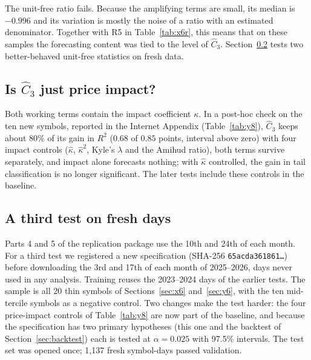 \documentclass[12pt]{article}
\theoremstyle{definition}
\theoremstyle{remark}
\begin{document}
The unit-free ratio fails. Because the amplifying terms are small, its median is $-0.996$ and its variation is mostly the noise of a ratio with an estimated denominator. Together with R5 in Table~\ref{tab:x6r}, this means that on these samples the forecasting content was tied to the level of $\hat C_3$. Section~\ref{sec:z6} tests two better-behaved unit-free statistics on fresh data.

\subsection{Is $\hat C_3$ just price impact?}\label{sec:y8}
Both working terms contain the impact coefficient $\kappa$. In a post-hoc check on the ten new symbols, reported in the Internet Appendix (Table~\ref{tab:y8}), $\hat C_3$ keeps about 80\% of its gain in $R^2$ ($0.68$ of $0.85$ points, interval above zero) with four impact controls ($\hat\kappa$, $\hat\kappa^2$, Kyle's $\lambda$ and the Amihud ratio), both terms survive separately, and impact alone forecasts nothing; with $\hat\kappa$ controlled, the gain in tail classification is no longer significant. The later tests include these controls in the baseline.

\subsection{A third test on fresh days}\label{sec:z6}
Parts 4 and 5 of the replication package use the 10th and 24th of each month. For a third test we registered a new specification (SHA-256 \texttt{65acda361861\ldots}) before downloading the 3rd and 17th of each month of 2025--2026, days never used in any analysis. Training reuses the 2023--2024 days of the earlier tests. The sample is all 20 thin symbols of Sections~\ref{sec:x6} and~\ref{sec:y6}, with the ten mid-tercile symbols as a negative control. Two changes make the test harder: the four price-impact controls of Table~\ref{tab:y8} are now part of the baseline, and because the specification has two primary hypotheses (this one and the backtest of Section~\ref{sec:backtest}) each is tested at $\alpha=0.025$ with 97.5\% intervals. The test set was opened once; 1{,}137 fresh symbol-days passed validation.
\end{document}

